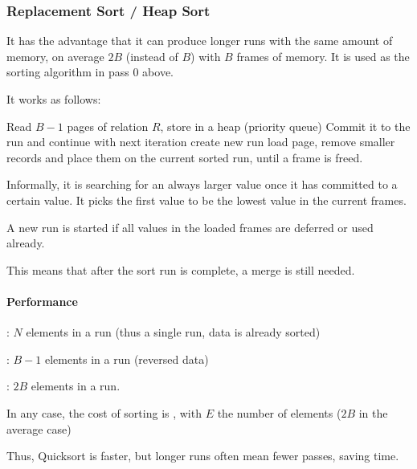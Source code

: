 \subsubsection{Replacement Sort / Heap Sort}
It has the advantage that it can produce longer runs with the same amount of memory, on average $2B$ (instead of $B$) with $B$ frames of memory.
It is used as the sorting algorithm in pass $0$ above.

It works as follows:
\begin{algorithm}
    \caption{Replacement Sort}
    \begin{algorithmic}[1]
            \State Read $B - 1$ pages of relation $R$, store in a heap (priority queue)
                    \State Commit it to the run and continue with next iteration
                    \State create new run
                \Else
                    \State load page, remove smaller records and place them on the current sorted run, until a frame is freed.
                \EndIf
            \EndFor
        \EndProcedure
    \end{algorithmic}
\end{algorithm}

Informally, it is searching for an always larger value once it has committed to a certain value.
It picks the first value to be the lowest value in the current frames.

A new run is started if all values in the loaded frames are deferred or used already.

This means that after the sort run is complete, a merge is still needed.

\paragraph{Performance}
: $N$ elements in a run (thus a single run, data is already sorted)

: $B - 1$ elements in a run (reversed data)

: $2B$ elements in a run.

In any case, the cost of sorting is , with $E$ the number of elements ($2B$ in the average case)

Thus, Quicksort is faster, but longer runs often mean fewer passes, saving time.
